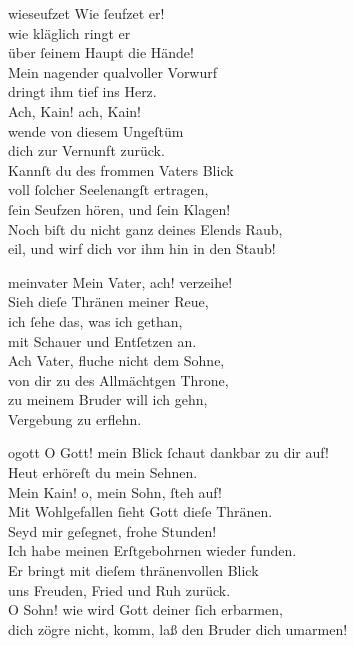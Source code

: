 \documentclass[tocstyle=ref-genre]{ees}
\begin{document}
{\begin{movement}{wieseufzet}
  \voice[Kain]
  Wie ſeufzet er!\\
  wie kläglich ringt er\\
  über ſeinem Haupt die Hände!\\
  Mein nagender qualvoller Vorwurf\\
  dringt ihm tief ins Herz.\\
  Ach, Kain! ach, Kain!\\
  wende von diesem Ungeſtüm\\
  dich zur Vernunft zurück.\\
  Kannſt du des frommen Vaters Blick\\
  voll ſolcher Seelenangſt ertragen,\\
  ſein Seufzen hören, und ſein Klagen!\\
  Noch biſt du nicht ganz deines Elends Raub,\\
  eil, und wirf dich vor ihm hin in den Staub!
\end{movement}

\begin{movement}{meinvater}
  \voice[Kain]
  Mein Vater, ach! verzeihe!\\
  Sieh dieſe Thränen meiner Reue,\\
  ich ſehe das, was ich gethan,\\
  mit Schauer und Entſetzen an.\\
  Ach Vater, fluche nicht dem Sohne,\\
  von dir zu des Allmächtgen Throne,\\
  zu meinem Bruder will ich gehn,\\
  Vergebung zu erflehn.
\end{movement}

\begin{movement}{ogott}
  \voice[Adam]
  O Gott! mein Blick ſchaut dankbar zu dir auf!\\
  Heut erhöreſt du mein Sehnen.\\
  Mein Kain! o, mein Sohn, ſteh auf!\\
  Mit Wohlgefallen ſieht Gott dieſe Thränen.\\
  Seyd mir geſegnet, frohe Stunden!\\
  Ich habe meinen Erſtgebohrnen wieder funden.\\
  Er bringt mit dieſem thränenvollen Blick\\
  uns Freuden, Fried und Ruh zurück.\\
  O Sohn! wie wird Gott deiner ſich erbarmen,\\
  dich zögre nicht, komm, laß den Bruder dich umarmen!


\end{movement}}
\end{document}

